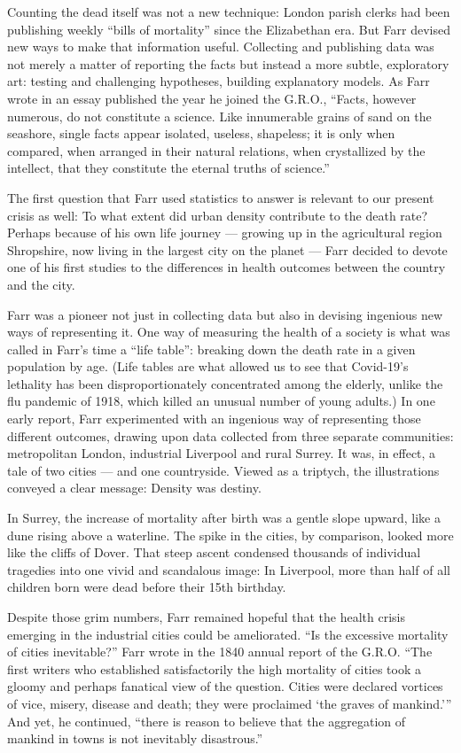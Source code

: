 Counting the dead itself was not a new technique: London parish clerks
had been publishing weekly ``bills of mortality'' since the Elizabethan
era. But Farr devised new ways to make that information useful.
Collecting and publishing data was not merely a matter of reporting the
facts but instead a more subtle, exploratory art: testing and
challenging hypotheses, building explanatory models. As Farr wrote in an
essay published the year he joined the G.R.O., ``Facts, however
numerous, do not constitute a science. Like innumerable grains of sand
on the seashore, single facts appear isolated, useless, shapeless; it is
only when compared, when arranged in their natural relations, when
crystallized by the intellect, that they constitute the eternal truths
of science.''

The first question that Farr used statistics to answer is relevant to
our present crisis as well: To what extent did urban density contribute
to the death rate? Perhaps because of his own life journey --- growing
up in the agricultural region Shropshire, now living in the largest city
on the planet --- Farr decided to devote one of his first studies to the
differences in health outcomes between the country and the city.

Farr was a pioneer not just in collecting data but also in devising
ingenious new ways of representing it. One way of measuring the health
of a society is what was called in Farr's time a ``life table'':
breaking down the death rate in a given population by age. (Life tables
are what allowed us to see that Covid-19's lethality has been
disproportionately concentrated among the elderly, unlike the flu
pandemic of 1918, which killed an unusual number of young adults.) In
one early report, Farr experimented with an ingenious way of
representing those different outcomes, drawing upon data collected from
three separate communities: metropolitan London, industrial Liverpool
and rural Surrey. It was, in effect, a tale of two cities --- and one
countryside. Viewed as a triptych, the illustrations conveyed a clear
message: Density was destiny.

In Surrey, the increase of mortality after birth was a gentle slope
upward, like a dune rising above a waterline. The spike in the cities,
by comparison, looked more like the cliffs of Dover. That steep ascent
condensed thousands of individual tragedies into one vivid and
scandalous image: In Liverpool, more than half of all children born were
dead before their 15th birthday.

Despite those grim numbers, Farr remained hopeful that the health crisis
emerging in the industrial cities could be ameliorated. ``Is the
excessive mortality of cities inevitable?'' Farr wrote in the 1840
annual report of the G.R.O. ``The first writers who established
satisfactorily the high mortality of cities took a gloomy and perhaps
fanatical view of the question. Cities were declared vortices of vice,
misery, disease and death; they were proclaimed `the graves of
mankind.''' And yet, he continued, ``there is reason to believe that the
aggregation of mankind in towns is not inevitably disastrous.''

